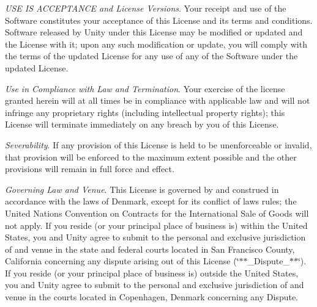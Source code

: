 \begin{DoxyEnumerate}
\item {\itshape U\+SE IS A\+C\+C\+E\+P\+T\+A\+N\+CE and License Versions}. Your receipt and use of the Software constitutes your acceptance of this License and its terms and conditions. Software released by Unity under this License may be modified or updated and the License with it; upon any such modification or update, you will comply with the terms of the updated License for any use of any of the Software under the updated License.
\end{DoxyEnumerate}
\begin{DoxyEnumerate}
\item {\itshape Use in Compliance with Law and Termination}. Your exercise of the license granted herein will at all times be in compliance with applicable law and will not infringe any proprietary rights (including intellectual property rights); this License will terminate immediately on any breach by you of this License.
\end{DoxyEnumerate}
\begin{DoxyEnumerate}
\item {\itshape Severability}. If any provision of this License is held to be unenforceable or invalid, that provision will be enforced to the maximum extent possible and the other provisions will remain in full force and effect.
\end{DoxyEnumerate}
\begin{DoxyEnumerate}
\item {\itshape Governing Law and Venue}. This License is governed by and construed in accordance with the laws of Denmark, except for its conflict of laws rules; the United Nations Convention on Contracts for the International Sale of Goods will not apply. If you reside (or your principal place of business is) within the United States, you and Unity agree to submit to the personal and exclusive jurisdiction of and venue in the state and federal courts located in San Francisco County, California concerning any dispute arising out of this License (\char`\"{}$\ast$$\ast$\+\_\+\+Dispute\+\_\+$\ast$$\ast$\char`\"{}). If you reside (or your principal place of business is) outside the United States, you and Unity agree to submit to the personal and exclusive jurisdiction of and venue in the courts located in Copenhagen, Denmark concerning any Dispute. 
\end{DoxyEnumerate}